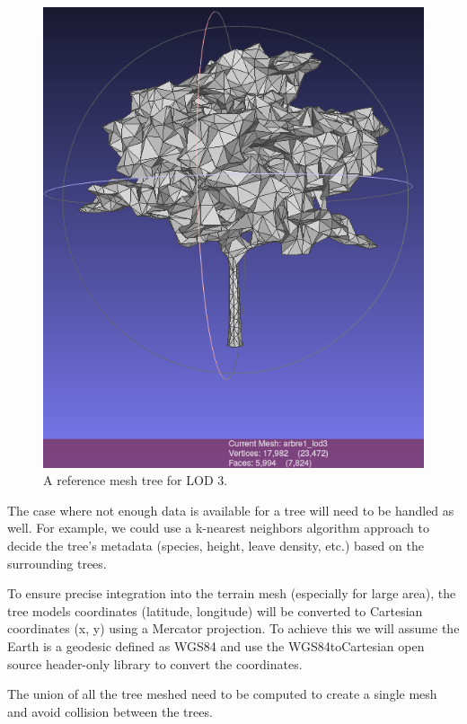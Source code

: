 \documentclass[12pt]{article}
\begin{document}
\begin{figure}[H]
\begin{minipage}{0.45\textwidth}
        \includegraphics[width=\textwidth]{images/lod3.png}
        \caption{A reference mesh tree for LOD 3.}
    \end{minipage}
\end{figure}

The case where not enough data is available for a tree will need to be handled
as well. For example, we could use a k-nearest neighbors algorithm \cite{k-NN} approach to
decide the tree's metadata (species, height, leave density, etc.) based on the
surrounding trees.

To ensure precise integration into the terrain mesh (especially for large area), the tree models coordinates
(latitude, longitude) will be converted to Cartesian coordinates (x, y) using
a Mercator projection\cite{mercator-proj}. To achieve this we will assume the Earth is a geodesic
defined as WGS84 \cite{wgs84} and use the WGS84toCartesian\cite{wgs84_to_cartesian} open source header-only
  library to convert the coordinates.

The union of all the tree meshed need to be computed to create a single mesh
and avoid collision between the trees.
\end{document}
